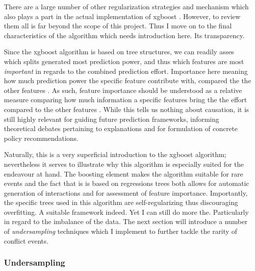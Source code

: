 \documentclass[a4paper]{article}
\begin{document}
There are a large number of other regularization strategies and mechanism which also plays a part in the actual implementation of xgboost \citep[787]{Chen_2016}. However, to review them all is far beyond the scope of this project. Thus I move on to the final characteristics of the algorithm which needs introduction here. Its transparency.\par

Since the xgboost algorithm is based on tree structures, we can readily asses which splits generated most prediction power, and thus which features are most \emph{important} in regards to the combined prediction effort. Importance here meaning how much prediction power the specific feature contribute with, compared the the other features \citep[787-788]{Chen_2016}. As such, feature importance should be understood as a relative measure comparing how much information a specific features bring the the effort compared to the other features \cite[367-368]{Friedman_2001}. While this tells us nothing about causation, it is still highly relevant for guiding future prediction frameworks, informing theoretical debates pertaining to explanations and for formulation of concrete policy recommendations.\par

Naturally, this is a very superficial introduction to the xgboost algorithm; nevertheless it serves to illustrate why this algorithm is especially suited for the endeavour at hand. The boosting element makes the algorithm suitable for rare events and the fact that is is based on regressions trees both allows for automatic generation of interactions and for assessment of feature importance. Importantly, the specific trees used in this algorithm are self-regularizing thus discouraging overfitting. A suitable framework indeed. Yet I can still do more the. Particularly in regard to the imbalance of the data. The next section will introduce a number of \emph{undersampling} techniques which I implement to further tackle the rarity of conflict events.\par 

\subsubsection{Undersampling}

\end{document}
